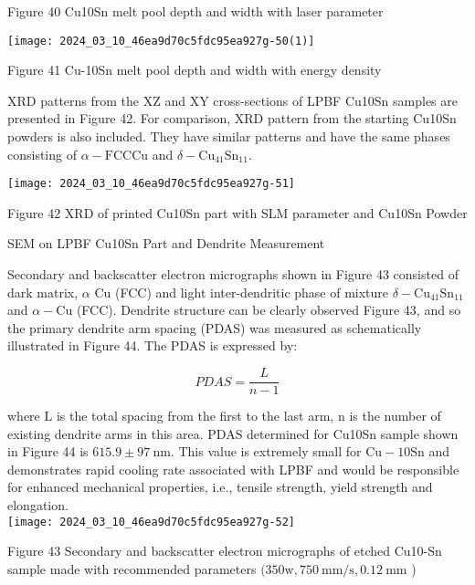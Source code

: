 \documentclass[10pt]{article}
\begin{document}
Figure 40 Cu10Sn melt pool depth and width with laser parameter

\begin{center}
\texttt{[image: 2024\_03\_10\_46ea9d70c5fdc95ea927g-50(1)]}
\end{center}

Figure 41 Cu-10Sn melt pool depth and width with energy density

XRD patterns from the XZ and XY cross-sections of LPBF Cu10Sn samples are presented in Figure 42. For comparison, XRD pattern from the starting Cu10Sn powders is also included. They have similar patterns and have the same phases consisting of $\alpha-\mathrm{FCC} \mathrm{Cu}$ and $\delta-\mathrm{Cu}_{41} \mathrm{Sn}_{11}$.

\begin{center}
\texttt{[image: 2024\_03\_10\_46ea9d70c5fdc95ea927g-51]}
\end{center}

Figure 42 XRD of printed Cu10Sn part with SLM parameter and Cu10Sn Powder

SEM on LPBF Cu10Sn Part and Dendrite Measurement

Secondary and backscatter electron micrographs shown in Figure 43 consisted of dark matrix, $\alpha$ $\mathrm{Cu}$ (FCC) and light inter-dendritic phase of mixture $\delta-\mathrm{Cu}_{41} \mathrm{Sn}_{11}$ and $\alpha-\mathrm{Cu}$ (FCC). Dendrite structure can be clearly observed Figure 43, and so the primary dendrite arm spacing (PDAS) was measured as schematically illustrated in Figure 44. The PDAS is expressed by:


\begin{equation*}
P D A S=\frac{L}{n-1} \tag{3}
\end{equation*}


where $\mathrm{L}$ is the total spacing from the first to the last arm, $\mathrm{n}$ is the number of existing dendrite arms in this area. PDAS determined for Cu10Sn sample shown in Figure 44 is $615.9 \pm 97 \mathrm{~nm}$. This value is extremely small for $\mathrm{Cu}-10 \mathrm{Sn}$ and demonstrates rapid cooling rate associated with LPBF and would be responsible for enhanced mechanical properties, i.e., tensile strength, yield strength and elongation.\\
\texttt{[image: 2024\_03\_10\_46ea9d70c5fdc95ea927g-52]}

Figure 43 Secondary and backscatter electron micrographs of etched Cu10-Sn sample made with recommended parameters $(350 \mathrm{w}, 750 \mathrm{~mm} / \mathrm{s}, 0.12 \mathrm{~mm}$ )
\end{document}
